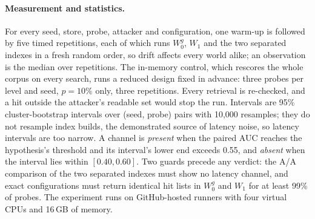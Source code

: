 \paragraph{Measurement and statistics.}
For every seed, store, probe, attacker and configuration, one warm-up is followed by five timed
repetitions, each of which runs $W_0^g$, $W_1$ and the two separated indexes in a fresh random order,
so drift affects every world alike; an observation is the median over repetitions. The in-memory
control, which rescores the whole corpus on every search, runs a reduced design fixed in advance:
three probes per level and seed, $p = 10\%$ only, three repetitions. Every retrieval is
re-checked, and a hit outside the attacker's readable set would stop the run. Intervals are 95\%
cluster-bootstrap intervals over (seed, probe) pairs with 10,000 resamples; they do not resample index builds, the demonstrated source of latency noise, so latency intervals are too narrow. A channel is
\emph{present} when the paired AUC reaches the hypothesis's threshold and its interval's lower end
exceeds 0.55, and \emph{absent} when the interval lies within $[0.40, 0.60]$. Two guards precede any
verdict: the A/A comparison of the two separated indexes must show no latency channel, and exact
configurations must return identical hit lists in $W_0^g$ and $W_1$ for at least 99\% of probes. The
experiment runs on GitHub-hosted runners with four virtual CPUs and 16\,GB of memory.

